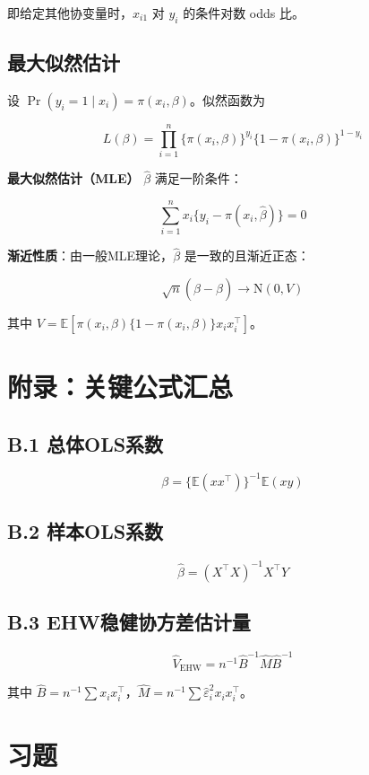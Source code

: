 即给定其他协变量时，$x_{i1}$ 对 $y_i$ 的条件对数 odds 比。

\subsection{最大似然估计}\label{sec:B-mle}

设 $\Pr(y_i = 1 \mid x_i) = \pi(x_i, \beta)$。似然函数为

\[
L(\beta) = \prod_{i=1}^n \{\pi(x_i, \beta)\}^{y_i} \{1 - \pi(x_i, \beta)\}^{1-y_i}
\tag{B.29}
\]

\textbf{最大似然估计（MLE）} $\hat{\beta}$ 满足一阶条件：

\[
\sum_{i=1}^n x_i \{y_i - \pi(x_i, \hat{\beta})\} = 0
\tag{B.30}
\]

\textbf{渐近性质}：由一般MLE理论，$\hat{\beta}$ 是一致的且渐近正态：

\[
\sqrt{n}(\hat{\beta} - \beta) \to \mathrm{N}(0, V)
\tag{B.31}
\]

其中 $V = \mathbb{E}[\pi(x_i, \beta)\{1 - \pi(x_i, \beta)\} x_i x_i^\top]$。

\section{附录：关键公式汇总}\label{sec:B-appendix-formulas}

\subsection{B.1 总体OLS系数}
\[
\beta = \{\mathbb{E}(x x^\top)\}^{-1} \mathbb{E}(x y)
\tag{B.2}
\]

\subsection{B.2 样本OLS系数}
\[
\hat{\beta} = (X^\top X)^{-1} X^\top Y
\tag{B.10}
\]

\subsection{B.3 EHW稳健协方差估计量}
\[
\hat{V}_{\mathrm{EHW}} = n^{-1} \hat{B}^{-1} \hat{M} \hat{B}^{-1}
\tag{B.17}
\]

其中 $\hat{B} = n^{-1}\sum x_i x_i^\top$，$\hat{M} = n^{-1}\sum \hat{\varepsilon}_i^2 x_i x_i^\top$。

\section{习题}\label{sec:B-exercises}

